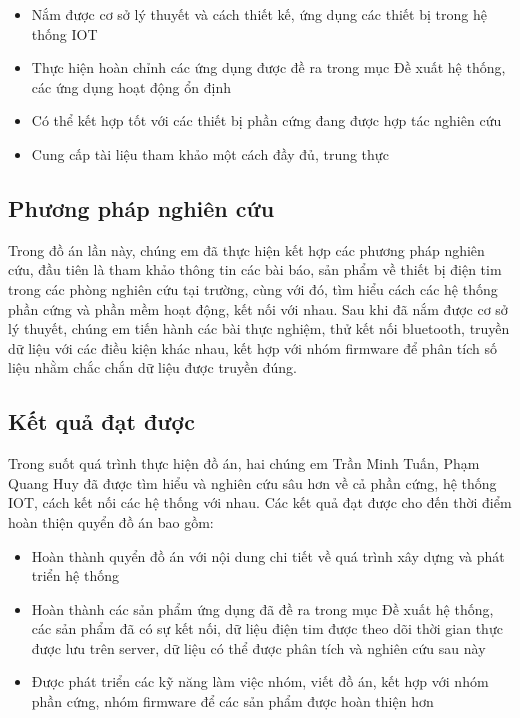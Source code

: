 \begin{adjustwidth}{1.5em}{}
  \begin{itemize}
      \item Nắm được cơ sở lý thuyết và cách thiết kế, ứng dụng các thiết bị trong hệ thống IOT
      \item Thực hiện hoàn chỉnh các ứng dụng được đề ra trong mục Đề xuất hệ thống, các ứng dụng hoạt động ổn định
      \item Có thể kết hợp tốt với các thiết bị phần cứng đang được hợp tác nghiên cứu
      \item Cung cấp tài liệu tham khảo một cách đầy đủ, trung thực

  \end{itemize}
  \end{adjustwidth}





\subsection*{Phương pháp nghiên cứu}
Trong đồ án lần này, chúng em đã thực hiện kết hợp các phương pháp nghiên cứu, đầu tiên là tham khảo thông tin các bài
báo, sản phẩm về thiết bị điện tim trong các phòng nghiên cứu tại trường, cùng với đó, tìm hiểu cách các hệ thống phần cứng và phần mềm hoạt động,
kết nối với nhau. Sau khi đã nắm được cơ sở lý thuyết, chúng em tiến hành các bài thực nghiệm, thử kết nối bluetooth, truyền dữ liệu với các điều kiện khác nhau,
kết hợp với nhóm firmware để phân tích số liệu nhằm chắc chắn dữ liệu được truyền đúng.

\subsection*{Kết quả đạt được}

Trong suốt quá trình thực hiện đồ án, hai chúng em Trần Minh Tuấn, Phạm Quang Huy đã được tìm hiểu và nghiên cứu sâu hơn về cả phần cứng,
hệ thống IOT, cách kết nối các hệ thống với nhau. Các kết quả đạt được cho đến thời điểm hoàn thiện quyển đồ án bao gồm:

\begin{adjustwidth}{1.5em}{}
  \begin{itemize}
      \item Hoàn thành quyển đồ án với nội dung chi tiết về quá trình xây dựng và phát triển hệ thống
      \item Hoàn thành các sản phẩm ứng dụng đã đề ra trong mục Đề xuất hệ thống, các sản phẩm đã có sự kết nối, dữ liệu điện tim được theo dõi
      thời gian thực được lưu trên server, dữ liệu có thể được phân tích và nghiên cứu sau này
      \item Được phát triển các kỹ năng làm việc nhóm, viết đồ án, kết hợp với nhóm phần cứng, nhóm firmware để các sản phẩm được hoàn thiện hơn
    \end{itemize}
  \end{adjustwidth}
